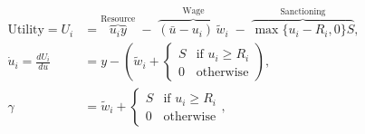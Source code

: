 \documentclass[10pt]{article}
\begin{document}
\begin{align*}\text{Utility} = U_i &= \overbrace{u_i y}^{\text{Resource}} \;-\; \overbrace{(\bar{u}-u_i)\,\tilde{w}_i}^{\text{Wage}} \;-\; \overbrace{\max\{u_i - R_i,0\} S}^{\text{Sanctioning}}, \\[6pt] 
\dot{u}_i = \frac{dU_i}{du} &= y - \left(\tilde{w}_i +\begin{cases} S & \text{if } u_i \ge  R_i \\[4pt] 0 & \text{otherwise} \end{cases}\right), \\[6pt]
 \gamma &= \tilde{w}_i + \begin{cases} S & \text{if } u_i \ge R_i \\[4pt] 0 & \text{otherwise} \end{cases}, \\[6pt]\end{align*}
\end{document}
